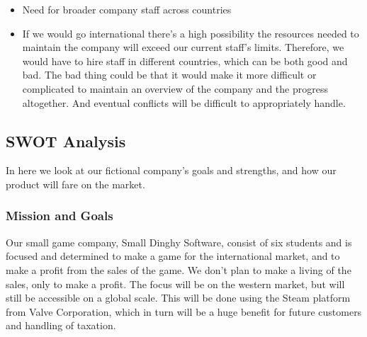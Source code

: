 	\begin{itemize}
		\item Need for broader company staff across countries
	\end{itemize}
	\begin{itemize}
	\item 	If we would go international there’s a high possibility the resources
   needed to maintain the company will exceed our current staff’s limits.
    Therefore, we would have to hire staff in different countries, which
    can be both good and bad. The bad thing could be that it would make
    it more difficult or complicated to maintain an overview of the company
     and the progress altogether. And eventual conflicts will be difficult
     to appropriately handle.
		 \end{itemize}
	
	\subsection{SWOT Analysis}
	In here we look at our fictional company’s goals and strengths, and how
   our product will fare on the market.
	\\
	\subsubsection{Mission and Goals}
	Our small game company, Small Dinghy Software, consist of six students
   and is focused and determined to make a game for the international market,
    and to make a profit from the sales of the game. We don’t plan to make a
     living of the sales, only to make a profit. The focus will be on the
     western market, but will still be accessible on a global scale. This
     will be done using the Steam platform from Valve Corporation, which
     in turn will be a huge benefit for future customers and handling of
     taxation.
	\\
